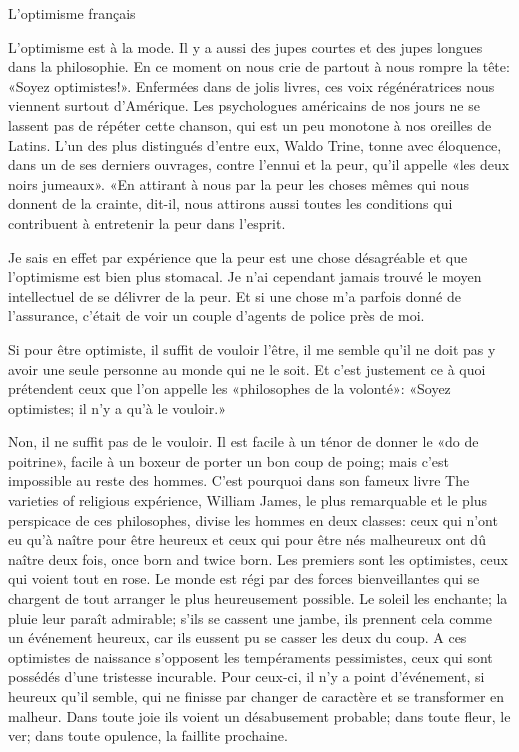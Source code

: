 \begin{chapter}{L'optimisme français}

L'optimisme est à la mode. Il y a aussi des jupes courtes et des jupes
longues dans la philosophie. En ce moment on nous crie de partout à nous
rompre la tête: «Soyez optimistes!». Enfermées dans de jolis livres, ces
voix régénératrices nous viennent surtout d'Amérique. Les psychologues
américains de nos jours ne se lassent pas de répéter cette chanson, qui
est un peu monotone à nos oreilles de Latins. L'un des plus distingués
d'entre eux, Waldo Trine, tonne avec éloquence, dans un de ses derniers
ouvrages, contre l'ennui et la peur, qu'il appelle «les deux noirs
jumeaux». «En attirant à nous par la peur les choses mêmes qui nous
donnent de la crainte, dit-il, nous attirons aussi toutes les conditions
qui contribuent à entretenir la peur dans l'esprit.

Je sais en effet par expérience que la peur est une chose désagréable et
que l'optimisme est bien plus stomacal. Je n'ai cependant jamais trouvé
le moyen intellectuel de se délivrer de la peur. Et si une chose m'a
parfois donné de l'assurance, c'était de voir un couple d'agents de
police près de moi.

Si pour être optimiste, il suffit de vouloir l'être, il me semble qu'il
ne doit pas y avoir une seule personne au monde qui ne le soit. Et c'est
justement ce à quoi prétendent ceux que l'on appelle les «philosophes de
la volonté»: «Soyez optimistes; il n'y a qu'à le vouloir.»

Non, il ne suffit pas de le vouloir. Il est facile à un ténor de donner
le «do de poitrine», facile à un boxeur de porter un bon coup de
poing; mais c'est impossible au reste des hommes. C'est pourquoi dans
son fameux livre The varieties of religious expérience, William James,
le plus remarquable et le plus perspicace de ces philosophes, divise les
hommes en deux classes: ceux qui n'ont eu qu'à naître pour être heureux
et ceux qui pour être nés malheureux ont dû naître deux fois, once born
and twice born. Les premiers sont les optimistes, ceux qui voient tout
en rose. Le monde est régi par des forces bienveillantes qui se chargent
de tout arranger le plus heureusement possible. Le soleil les enchante;
la pluie leur paraît admirable; s'ils se cassent une jambe, ils prennent
cela comme un événement heureux, car ils eussent pu se casser les deux
du coup. A ces optimistes de naissance s'opposent les tempéraments
pessimistes, ceux qui sont possédés d'une tristesse incurable. Pour
ceux-ci, il n'y a point d'événement, si heureux qu'il semble, qui ne
finisse par changer de caractère et se transformer en malheur. Dans
toute joie ils voient un désabusement probable; dans toute fleur, le
ver; dans toute opulence, la faillite prochaine.


\end{chapter}
